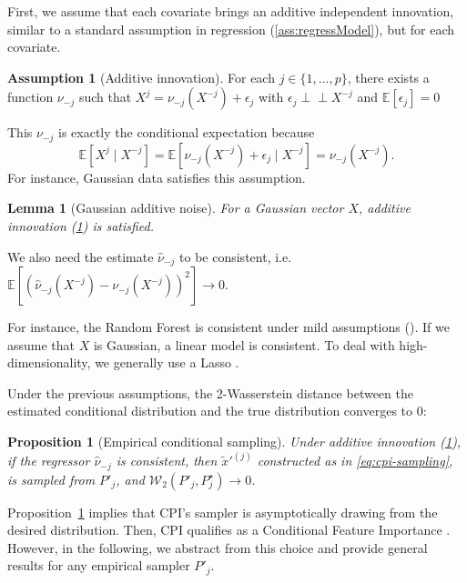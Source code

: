 \documentclass{article}
\theoremstyle{plain}
\newtheorem{proposition}[theorem]{Proposition}
\newtheorem{lemma}[theorem]{Lemma}
\theoremstyle{definition}
\newtheorem{assumption}[theorem]{Assumption}
\theoremstyle{remark}
\newcommand{\e}[1]{\mathbb{E}\left[#1\right]  } %
\newcommand{\indep}{\perp\!\!\!\perp}
\begin{document}
First, we assume that each covariate brings an additive independent innovation, similar to a standard assumption in regression (\ref{ass:regressModel}), but for each covariate.
%
 \begin{assumption}[Additive innovation]\label{ass:generalAssumpCondSampl} For each $j\in\{1,\ldots,p\}$, there exists a function $\nu_{-j}$ such that $X^j=\nu_{-j}(X^{-j})+\epsilon_j$ with $\epsilon_j\indep X^{-j}$ and $\e{\epsilon_j}=0$
\end{assumption}
%
 This $\nu_{-j}$ is exactly the conditional expectation because $$\e{X^{j}\mid X^{-j}}=\e{\nu_{-j}\left(X^{-j}\right)+\epsilon_j\mid X^{-j}}=\nu_{-j}\left(X^{-j}\right).$$
%
For instance, Gaussian data satisfies this assumption.
\begin{lemma}[Gaussian additive noise] For a Gaussian vector $X$, additive innovation (\ref{ass:generalAssumpCondSampl}) is satisfied.\label{lemma:GaussianAss}
\end{lemma}
We also need the estimate $\widehat{\nu}_{-j}$ to be consistent, i.e.
$\e{\left(\widehat{\nu}_{-j}\left(X^{-j}\right)-\nu_{-j}\left(X^{-j}\right)\right)^2}\to 0.$

For instance, the Random Forest is consistent under mild assumptions (\citet{Scornet_2015ConsistencyRF}). 
%
If we assume that $X$ is Gaussian, a linear model is consistent. 
%
To deal with high-dimensionality, we generally use a Lasso \cite{lasso}.


Under the previous assumptions, the 2-Wasserstein distance between the estimated conditional distribution and the true distribution converges to 0:

\begin{proposition}[Empirical conditional sampling]
    Under additive innovation (\ref{ass:generalAssumpCondSampl}), if the regressor $\widehat{\nu}_{-j}$ is consistent, then $\widetilde{x}'^{(j)}$ constructed as in \eqref{eq:cpi-sampling}, is sampled from $P'_j$, and $\mathcal{W}_2(P'_j, P^\star_j)\to 0$. \label{prop:empCondSamp}
\end{proposition}
%
Proposition~\ref{prop:empCondSamp} implies that CPI's sampler is asymptotically drawing from the desired distribution. Then, CPI qualifies as a Conditional Feature Importance \cite{Hooker2021}. However, in the following, we abstract from this choice and provide general results for any empirical sampler $P'_j$.
\end{document}
